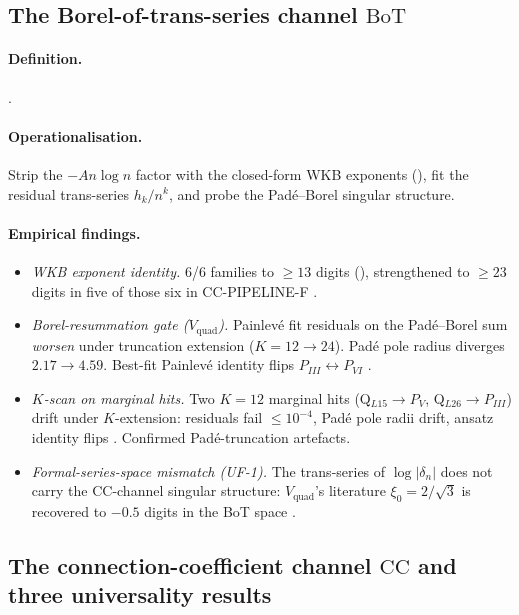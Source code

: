 \documentclass[11pt,reqno]{amsart}
\theoremstyle{plain}
\theoremstyle{definition}
\theoremstyle{remark}
\newcommand{\BoT}{\mathrm{BoT}}
\newcommand{\CC}{\mathrm{CC}}
\newcommand{\Vquad}{V_{\mathrm{quad}}}
\newcommand{\dn}{\delta_{n}}
\begin{document}
\subsection{The Borel-of-trans-series channel $\BoT$}
\label{ssec:bot}

\paragraph{Definition.} .

\paragraph{Operationalisation.} Strip the $-A n \log n$
factor with the closed-form WKB exponents (),
fit the residual trans-series $h_k/n^k$, and probe the
Pad\'e--Borel singular structure.

\paragraph{Empirical findings.}
\begin{itemize}
\item \emph{WKB exponent identity.} 6/6 families to
$\ge 13$ digits (), strengthened to
$\ge 23$ digits in five of those six in
CC-PIPELINE-F \cite{siarc_cc_pipeline_f}.
\item \emph{Borel-resummation gate ($\Vquad$).} Painlev\'e
fit residuals on the Pad\'e--Borel sum
\emph{worsen} under truncation extension
($K = 12 \to 24$). Pad\'e pole radius diverges
$2.17 \to 4.59$. Best-fit Painlev\'e identity flips
$P_{III} \leftrightarrow P_{VI}$ \cite{siarc_borel_5x}.
\item \emph{$K$-scan on marginal hits.} Two $K=12$ marginal
hits (Q$_{L15} \to P_V$, Q$_{L26} \to P_{III}$) drift under
$K$-extension: residuals fail $\le 10^{-4}$, Pad\'e pole
radii drift, ansatz identity flips
\cite{siarc_borel_kscan}. Confirmed Pad\'e-truncation
artefacts.
\item \emph{Formal-series-space mismatch (UF-1).} The trans-series
of $\log|\dn|$ does not carry the $\CC$-channel singular structure:
$\Vquad$'s literature $\xi_0 = 2/\sqrt 3$ is recovered to $-0.5$
digits in the BoT space \cite{siarc_cc_pipeline_f}.
\end{itemize}

\subsection{The connection-coefficient channel $\CC$
and three universality results}
\label{ssec:cc}
\end{document}
